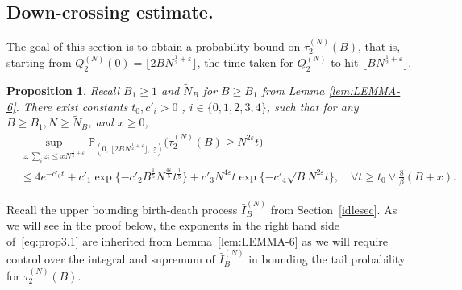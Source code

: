 \documentclass[11pt, reqno]{article}
\newtheorem{prop}[theorem]{Proposition}
\numberwithin{equation}{section}
\numberwithin{theorem}{section}
\newcommand\blue[1]{#1}
\begin{document}
\subsection{Down-crossing estimate.}\label{downsec}
The goal of this section is to obtain a probability bound on $\tau^{(N)}_2(B)$, that is, starting from $Q^{(N)}_2(0)=\lfloor 2BN^{\frac{1}{2}+\varepsilon} \rfloor$, the time taken for $Q^{(N)}_2$ to hit $\lfloor BN^{\frac{1}{2}+\varepsilon} \rfloor$.
\begin{prop}\label{prop:DOWNCROSS}
Recall $B_1 \ge 1$ and $\tilde N_B$ for $B \ge B_1$ from Lemma \ref{lem:LEMMA-6}. There exist constants $ t_0, c'_i>0$ , $i\in\{0,1,2,3,4\}$, such that for any $B\geq B_1, N\geq \tilde N_B$, and $x \ge 0$,
\begin{equation}\label{eq:prop3.1}
    \begin{split}
         &\sup_{\underline{z}: \sum_iz_i \leq xN^{\frac{1}{2}+\varepsilon}}\mathbb{P}_{(0, \, \lfloor 2BN^{\frac{1}{2}+\varepsilon} \rfloor, \,\underline{z})}\big(\tau^{(N)}_2(B)\geq N^{2\varepsilon}t\big)\\
    &\leq 4e^{-c'_0t}+c'_1\exp \{-c'_2 B^{\frac{1}{5}}N^{\frac{4\varepsilon}{5}}t^{\frac{1}{5}}\}+c'_3N^{4\varepsilon}t\exp \{-c'_4\sqrt{B}N^{2\varepsilon}t\},\quad\forall t\geq t_0\vee \frac{8}{\beta}(B+x).
    \end{split}
\end{equation}
\end{prop}
Recall the upper bounding birth-death process  $\bar{I}_B^{(N)}$ from Section~\ref{idlesec}.
\blue{As we will see in the proof below, the exponents in the right hand side of~\eqref{eq:prop3.1} are inherited from Lemma~\ref{lem:LEMMA-6} as we will require control over the integral and supremum of $\bar{I}_B^{(N)}$ in bounding the tail probability for $\tau^{(N)}_2(B)$.}
\end{document}
